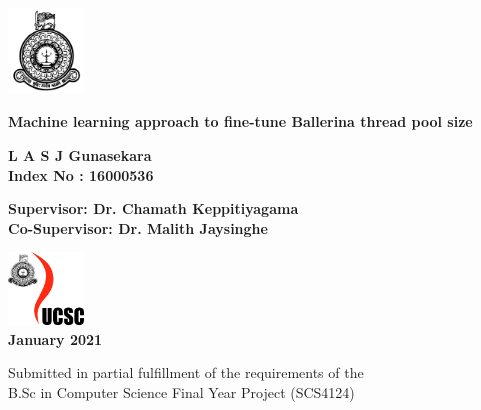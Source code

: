 \begin{titlepage}
	\begin{center}
		
		\includegraphics[width=0.15\textwidth]{figures/UoC-logo-black.png}
		
		\vspace{1.5cm}
		
		\textbf{\huge Machine learning approach to fine-tune Ballerina thread pool size}
		
		\vspace{3cm}
		\textbf{\Large{L A S J Gunasekara}}\\
		\textbf{\Large{Index No : 16000536}}
		
		\vspace{3cm}
		\textbf{\Large{Supervisor: Dr. Chamath Keppitiyagama}}\\
		\textbf{\Large{Co-Supervisor: Dr. Malith Jaysinghe}}
		
		
		\vspace{1.5cm}
		\includegraphics[width=0.15\textwidth]{figures/UCSC_Logo.jpg}
		\vspace{1cm}\\
		\textbf{\Large{January 2021}}
		
		\large{Submitted in partial fulfillment of the requirements of the\\
			B.Sc in Computer Science Final Year Project (SCS4124)}
		
		
		\vspace{0.7cm}
		
		
		
	\end{center}
\end{titlepage}